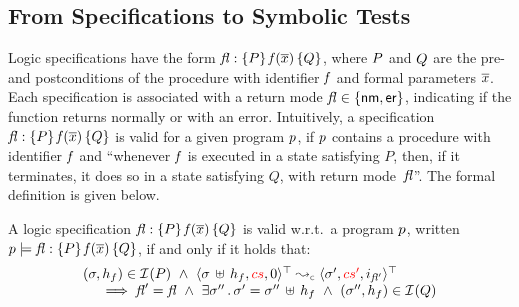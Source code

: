 \subsection{From Specifications to Symbolic Tests}\label{specs:to:symbolic:tests}

\jsil Logic specifications have the form ${\mathit{fl}} : \{ P \} \, \mathit{f}(\overline{x}) \, \{ Q \}$, where $P$ and $Q$ are the 
pre- and postconditions of the procedure with identifier $\mathit{f}$ and formal parameters $\overline{x}$. 
Each specification is associated with a return mode $\mathit{fl} \in \{ {\sf nm}, {\sf er} \}$, indicating if the function
 returns normally or with an error. 
 Intuitively, a specification ${\mathit{fl}} : \{ P \} \, \mathit{f}(\overline{x}) \, \{ Q \}$ is 
valid for a given \jsil program $p$, if $p$ contains a procedure with identifier 
$\mathit{f}$ and ``whenever $\mathit{f}$ is executed in a state satisfying $P$, then, 
if it terminates, it does so in a state satisfying $Q$, with return mode~$\mathit{fl}$''.
The formal definition is given below. 


\begin{definition}
A \jsil logic specification ${\mathit{fl}} : \{ P \} \, \mathit{f}(\overline{x}) \, \{ Q \}$ is valid w.r.t.~a program 
$p$, written $p \models {\ensuremath{\mathit{fl}}} : \{ P \} \, \mathit{f}(\overline{x}) \, \{ Q \}$, if and only if it holds that: 
$$
\begin{array}{l}
   (\jstate, \heap_f) \in \interpret{}{}(P) 
   \ \wedge \ 
    \abssemrule{\jstate \dunion \heap_f, \polish{\cs}, 0}{\jstate', \polish{\cs'}, i_{\flag'}}{\top}{\top}{\concrete} \\ \quad \
   \implies
      \flag' = \flag \ \wedge \ \exists \jstate'' \, . \, \jstate' = \jstate'' \dunion \heap_f
          \ \wedge \   (\jstate'', \heap_f) \in \interpret{}{}(Q) 
\end{array}
$$
\end{definition}


